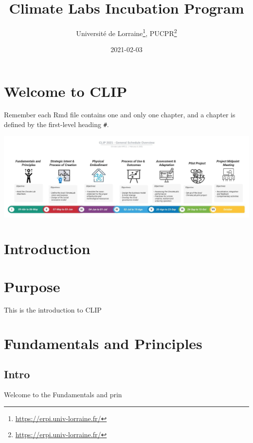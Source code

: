 \documentclass[
]{book}
\title{Climate Labs Incubation Program}
\author{Université de Lorraine\footnote{\url{https://erpi.univ-lorraine.fr/}}, PUCPR\footnote{\url{https://erpi.univ-lorraine.fr/}}}
\date{2021-02-03}
\begin{document}
\maketitle

{
\setcounter{tocdepth}{1}
\tableofcontents
}
\hypertarget{welcome-to-clip}{%
\chapter*{Welcome to CLIP}\label{welcome-to-clip}}

Remember each Rmd file contains one and only one chapter, and a chapter is defined by the first-level heading \texttt{\#}.

\includegraphics[width=30.21in]{Figures/CLIP-global-00}

\hypertarget{introduction}{%
\chapter*{Introduction}\label{introduction}}

\hypertarget{purpose}{%
\chapter*{Purpose}\label{purpose}}

This is the introduction to CLIP

\hypertarget{intro}{%
\chapter{Fundamentals and Principles}\label{intro}}

\hypertarget{intro-1}{%
\section{Intro}\label{intro-1}}

Welcome to the Fundamentals and prin
\end{document}
